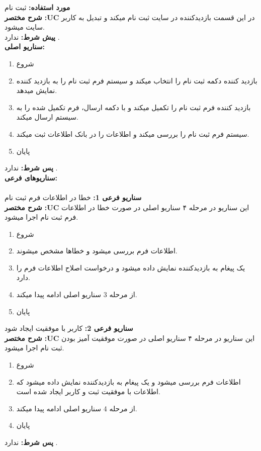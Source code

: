 \documentclass[20pt,a5paper]{report}
\begin{document}
\noindent \textbf{مورد استفاده:}
ثبت نام
\\
\textbf{شرح مختصر :UC}
در این قسمت بازدیدکننده در سایت ثبت نام میکند و تبدیل به کاربر سایت میشود.
\\
\textbf{پيش شرط:}
ندارد .
\\
\textbf{سناريو اصلی:}
\begin{enumerate}
\item 
شروع
\item 
بازدید کننده دکمه ثبت نام را انتخاب میکند و سیستم فرم ثبت نام را به بازدید کننده نمایش میدهد.
\item 
بازدید کننده فرم ثبت نام را تکمیل میکند و با دکمه ارسال، فرم تکمیل شده را به سیستم ارسال میکند.
\item 
سیستم فرم ثبت نام را بررسی میکند و اطلاعات را در بانک اطلاعات ثبت میکند.
\item 
پایان
\end{enumerate}
\textbf{پس شرط:}
ندارد .
\\
\textbf{سناريوهای فرعی:}
\\ \\
\textbf{سناريو فرعی 1:}
خطا در اطلاعات فرم ثبت نام
\\
\textbf{شرح مختصر :UC}
این سناریو در مرحله ۴ سناریو اصلی در صورت خطا در اطلاعات فرم ثبت نام اجرا میشود.
\begin{enumerate}
\item 
شروع
\item 
اطلاعات فرم بررسی میشود و خطاها مشخص میشوند.
\item 
یک پیغام به بازدیدکننده نمایش داده میشود و درخواست اصلاح اطلاعات فرم را دارد.
\item 
از مرحله 3 سناریو اصلی ادامه پیدا میکند.
\item 
پایان
\end{enumerate}
\textbf{سناريو فرعی 2:}
کاربر با موفقیت ایجاد شود
\\
\textbf{شرح مختصر :UC}
این سناریو در مرحله ۴ سناریو اصلی در صورت موفقیت آمیز بودن ثبت نام اجرا میشود.
\begin{enumerate}
\item 
شروع
\item 
اطلاعات فرم بررسی میشود و یک پیغام به بازدیدکننده نمایش داده میشود که اطلاعات با موفقیت ثبت و کاربر ایجاد شده است.
\item 
از مرحله 4 سناریو اصلی ادامه پیدا میکند.
\item 
پایان
\end{enumerate}

\textbf{پس شرط:}
ندارد .


\centering
\vfill
\lr{\LaTeX}
\end{document}
